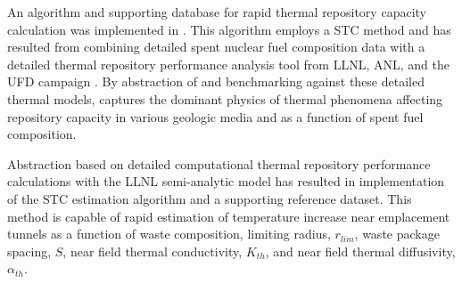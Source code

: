 
An algorithm and supporting database for rapid thermal repository capacity 
calculation was implemented in \Cyder.  This algorithm employs a \gls{STC} 
method \cite{radel_effect_2007, radel_repository_2007} and has resulted from 
combining detailed spent nuclear fuel composition data \cite{carter_fuel_2011} 
with a detailed thermal repository performance analysis tool from \gls{LLNL}, 
\gls{ANL}, and the \gls{UFD} campaign \cite{greenberg_application_2012}. By abstraction of 
and benchmarking against these detailed thermal models, \Cyder captures the 
dominant physics of thermal phenomena affecting repository capacity in various 
geologic media and as a function of spent fuel composition.

Abstraction based on detailed computational thermal repository performance 
calculations with the \gls{LLNL} semi-analytic model has resulted in implementation 
of the \gls{STC} estimation algorithm and a supporting reference dataset.  This 
method is capable of rapid estimation of temperature increase near emplacement 
tunnels as a function of waste composition, limiting radius, $r_{lim}$, waste 
package spacing, $S$, near field thermal conductivity, $K_{th}$, and near field 
thermal diffusivity, $\alpha_{th}$.
